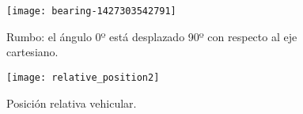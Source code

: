\begin{figure}[H]
	\begin{minipage}{.5\textwidth}
		\begin{center}
			\texttt{[image: bearing-1427303542791]}
			\caption{Rumbo: el ángulo 0º está desplazado 90º con respecto al eje cartesiano.}
			\label{figure:Bearing}
		\end{center}
	\end{minipage}
	\begin{minipage}{.5\textwidth}
		\begin{center}
			\texttt{[image: relative\_position2]}
			\caption{Posición relativa vehicular.}
			\label{figure:VRP}
		\end{center}
	\end{minipage}
\end{figure}